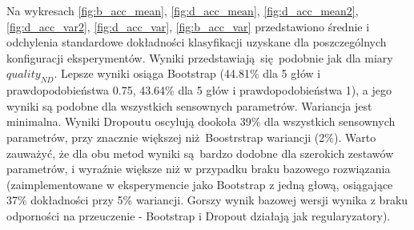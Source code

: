 Na wykresach \ref{fig:b_acc_mean}, \ref{fig:d_acc_mean}, \ref{fig:d_acc_mean2}, \ref{fig:d_acc_var2}, \ref{fig:d_acc_var}, \ref{fig:b_acc_var} przedstawiono średnie i odchylenia standardowe dokładności klasyfikacji uzyskane dla poszczególnych konfiguracji eksperymentów. Wyniki przedstawiają się podobnie jak dla miary $quality_{ND}$. Lepsze wyniki osiąga Bootstrap (44.81\% dla 5 głów i prawdopodobieństwa 0.75, 43.64\%  dla 5 głów i prawdopodobieństwa 1), a jego wyniki są podobne dla wszystkich sensownych parametrów. Wariancja jest minimalna. Wyniki Dropoutu oscylują dookoła 39\% dla wszystkich sensownych parametrów, przy znacznie większej niż Boostrstrap wariancji (2\%). Warto zauważyć, że dla obu metod wyniki są bardzo dodobne dla szerokich zestawów parametrów, i wyraźnie większe niż w przypadku braku bazowego rozwiązania (zaimplementowane w eksperymencie jako Bootstrap z jedną głową, osiągające 37\% dokładności przy 5\% wariancji. Gorszy wynik bazowej wersji wynika z braku odporności na przeuczenie - Bootstrap i Dropout działają jak regularyzatory).



